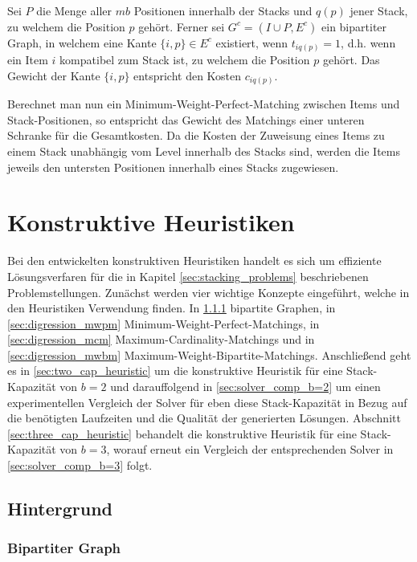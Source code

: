 Sei $P$ die Menge aller $mb$ Positionen innerhalb der Stacks und $q(p)$ jener Stack, zu welchem die Position $p$ gehört.
Ferner sei $G^c = (I \cup P, E^c)$ ein bipartiter Graph, in welchem eine Kante $\{i, p\} \in E^c$ existiert,
wenn $t_{iq(p)} = 1$, d.h. wenn ein Item $i$ kompatibel zum Stack ist, zu welchem die Position $p$ gehört.
Das Gewicht der Kante $\{i, p\}$ entspricht den Kosten $c_{iq(p)}$.

Berechnet man nun ein Minimum-Weight-Perfect-Matching zwischen Items und Stack-Positionen, so entspricht
das Gewicht des Matchings einer unteren Schranke für die Gesamtkosten. Da die Kosten der Zuweisung eines Items
zu einem Stack unabhängig vom Level innerhalb des Stacks sind, werden die Items jeweils den untersten Positionen
innerhalb eines Stacks zugewiesen.

\vfill

\pagebreak

\section{Konstruktive Heuristiken}
\label{sec:constructive_heuristics}

Bei den entwickelten konstruktiven Heuristiken handelt es sich um effiziente Lösungsverfaren für die in Kapitel \ref{sec:stacking_problems}
beschriebenen Problemstellungen. Zunächst werden vier wichtige Konzepte eingeführt, welche in den Heuristiken Verwendung finden.
In \ref{sec:digression_bipartite_graph} bipartite Graphen, in \ref{sec:digression_mwpm} Minimum-Weight-Perfect-Matchings, in \ref{sec:digression_mcm} Maximum-Cardinality-Matchings und in \ref{sec:digression_mwbm} Maximum-Weight-Bipartite-Matchings. Anschließend geht es in \ref{sec:two_cap_heuristic} um die konstruktive Heuristik
für eine Stack-Kapazität von $b=2$ und darauffolgend in \ref{sec:solver_comp_b=2} um einen experimentellen Vergleich der Solver für
eben diese Stack-Kapazität in Bezug auf die benötigten Laufzeiten und die Qualität der generierten Lösungen.
Abschnitt \ref{sec:three_cap_heuristic} behandelt die konstruktive Heuristik für eine Stack-Kapazität von $b=3$, worauf erneut ein Vergleich der entsprechenden Solver in \ref{sec:solver_comp_b=3} folgt.

\subsection{Hintergrund}

\subsubsection{Bipartiter Graph}
\label{sec:digression_bipartite_graph}

